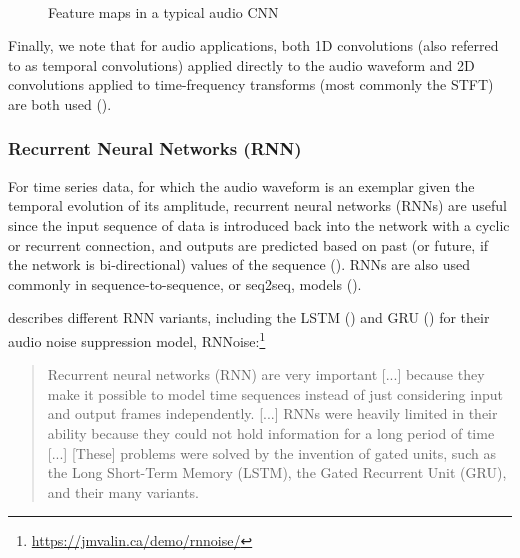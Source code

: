 \documentclass[report.tex]{subfiles}
\begin{document}
\begin{figure}[ht]
	\centering
	\\
	\caption{Feature maps in a typical audio CNN}
	\label{fig:audiocnn}
\end{figure}

Finally, we note that for audio applications, both 1D convolutions (also referred to as temporal convolutions) applied directly to the audio waveform and 2D convolutions applied to time-frequency transforms (most commonly the STFT) are both used (\cite{tcn, 2dconv}).

\subsubsection{Recurrent Neural Networks (RNN)}

For time series data, for which the audio waveform is an exemplar given the temporal evolution of its amplitude, recurrent neural networks (RNNs) are useful since the input sequence of data is introduced back into the network with a cyclic or recurrent connection, and outputs are predicted based on past (or future, if the network is bi-directional) values of the sequence (\cite{rnns}). RNNs are also used commonly in sequence-to-sequence, or seq2seq, models (\cite{seq2seqs}).

\textcite{rnnoise} describes different RNN variants, including the LSTM (\cite{lstm1}) and GRU (\cite{gru1}) for their audio noise suppression model, RNNoise:\footnote{\url{https://jmvalin.ca/demo/rnnoise/}}

\begin{quote}
	Recurrent neural networks (RNN) are very important [...] because they make it possible to model time sequences instead of just considering input and output frames independently. [...] RNNs were heavily limited in their ability because they could not hold information for a long period of time [...] [These] problems were solved by the invention of gated units, such as the Long Short-Term Memory (LSTM), the Gated Recurrent Unit (GRU), and their many variants.
\end{quote}
\end{document}
